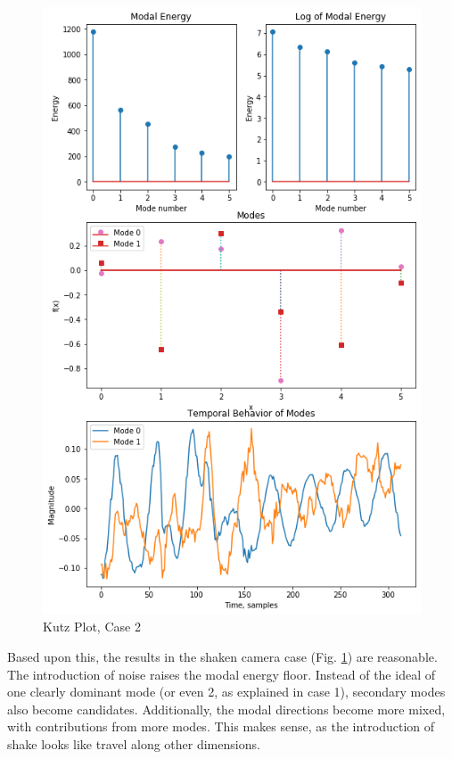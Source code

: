 \documentclass[journal]{IEEEtran}
\begin{document}
\begin{figure}
	\centerline{\includegraphics[width=\columnwidth]{kutz2.png}}
	\caption{Kutz Plot, Case 2}
	\label{kutz2}
\end{figure}

Based upon this, the results in the shaken camera case (Fig. \ref{kutz2}) are reasonable. The
introduction of noise raises the modal energy floor. Instead of the ideal of one clearly dominant
mode (or even 2, as explained in case 1), secondary modes also become candidates. Additionally,
the modal directions become more mixed, with contributions from more modes. This makes sense, as
the introduction of shake looks like travel along other dimensions.
\end{document}
